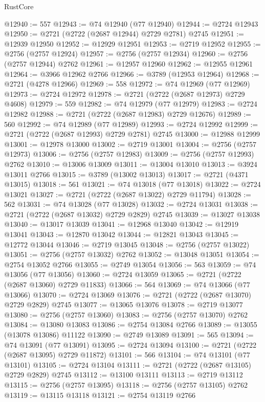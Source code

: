 \begin{lexlean}{RustCore}
\begin{coremodule}
@12940 := 557
@12943 := @74 @12940 (@77 @12940)
@12944 := @2724 @12943
@12950 := @2721 (@2722 (@2687 @12944) @2729 @2781) @2745
@12951 := @12939 @12950
@12952 := @12929 @12951
@12953 := @2719 @12952
@12955 := @2756 (@2757 @12924)
@12957 := @2756 (@2757 @12934)
@12960 := @2756 (@2757 @12944) @2762
@12961 := @12957 @12960
@12962 := @12955 @12961
@12964 := @3966 @12962 @2766
@12966 := @3789 (@12953 @12964)
@12968 := @2721 (@4278 @12966)
@12969 := 558
@12972 := @74 @12969 (@77 @12969)
@12973 := @2724 @12972
@12978 := @2721 (@2722 (@2687 @12973) @2729 @4608)
@12979 := 559
@12982 := @74 @12979 (@77 @12979)
@12983 := @2724 @12982
@12988 := @2721 (@2722 (@2687 @12983) @2729 @12676)
@12989 := 560
@12992 := @74 @12989 (@77 @12989)
@12993 := @2724 @12992
@12999 := @2721 (@2722 (@2687 @12993) @2729 @2781) @2745
@13000 := @12988 @12999
@13001 := @12978 @13000
@13002 := @2719 @13001
@13004 := @2756 (@2757 @12973)
@13006 := @2756 (@2757 @12983)
@13009 := @2756 (@2757 @12993) @2762
@13010 := @13006 @13009
@13011 := @13004 @13010
@13013 := @3924 @13011 @2766
@13015 := @3789 (@13002 @13013)
@13017 := @2721 (@4371 @13015)
@13018 := 561
@13021 := @74 @13018 (@77 @13018)
@13022 := @2724 @13021
@13027 := @2721 (@2722 (@2687 @13022) @2729 @11794)
@13028 := 562
@13031 := @74 @13028 (@77 @13028)
@13032 := @2724 @13031
@13038 := @2721 (@2722 (@2687 @13032) @2729 @2829) @2745
@13039 := @13027 @13038
@13040 := @13017 @13039
@13041 := @12968 @13040
@13042 := @12919 @13041
@13043 := @12870 @13042
@13044 := @12821 @13043
@13045 := @12772 @13044
@13046 := @2719 @13045
@13048 := @2756 (@2757 @13022)
@13051 := @2756 (@2757 @13032) @2762
@13052 := @13048 @13051
@13054 := @2754 @13052 @2766
@13055 := @2749 @13054
@13056 := 563
@13059 := @74 @13056 (@77 @13056)
@13060 := @2724 @13059
@13065 := @2721 (@2722 (@2687 @13060) @2729 @11833)
@13066 := 564
@13069 := @74 @13066 (@77 @13066)
@13070 := @2724 @13069
@13076 := @2721 (@2722 (@2687 @13070) @2729 @2829) @2745
@13077 := @13065 @13076
@13078 := @2719 @13077
@13080 := @2756 (@2757 @13060)
@13083 := @2756 (@2757 @13070) @2762
@13084 := @13080 @13083
@13086 := @2754 @13084 @2766
@13089 := @13055 (@13078 @13086) @11122
@13090 := @2749 @13089
@13091 := 565
@13094 := @74 @13091 (@77 @13091)
@13095 := @2724 @13094
@13100 := @2721 (@2722 (@2687 @13095) @2729 @11872)
@13101 := 566
@13104 := @74 @13101 (@77 @13101)
@13105 := @2724 @13104
@13111 := @2721 (@2722 (@2687 @13105) @2729 @2829) @2745
@13112 := @13100 @13111
@13113 := @2719 @13112
@13115 := @2756 (@2757 @13095)
@13118 := @2756 (@2757 @13105) @2762
@13119 := @13115 @13118
@13121 := @2754 @13119 @2766

\end{coremodule}
\end{lexlean}
